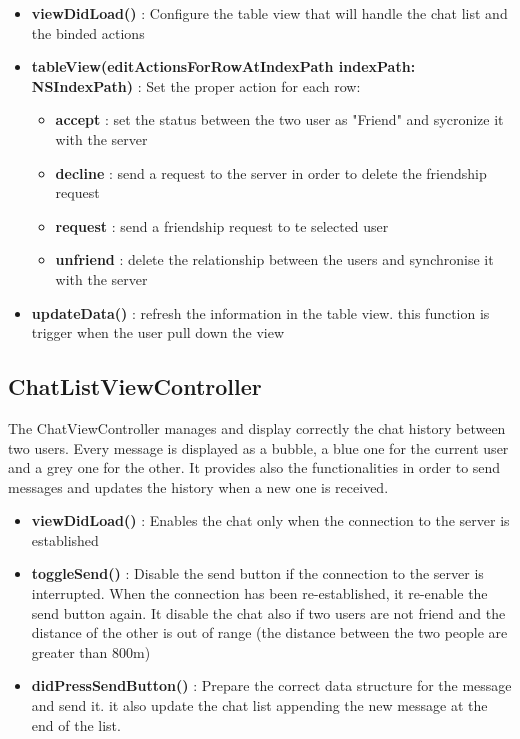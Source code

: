 \begin{itemize}

\item \textbf{viewDidLoad()} : Configure the table view that will handle the chat list and the binded actions

\item \textbf{tableView(editActionsForRowAtIndexPath indexPath: NSIndexPath)} : Set the proper action for each row:

\begin{itemize}
\item \textbf{accept} : set the status between the two user as "Friend" and sycronize it with the server
\item \textbf{decline} : send a request to the server in order to delete the friendship request
\item \textbf{request} : send a friendship request to te selected user
\item \textbf{unfriend} : delete the relationship between the users and synchronise it with the server

\end{itemize}

\item \textbf{updateData()} : refresh the information in the table view. this function is trigger when the user pull down the view

\end{itemize}

\subsection{ChatListViewController} 

The ChatViewController manages and display correctly the chat history between two users. Every message is displayed as a bubble, a blue one for the current user and a grey one for the other. It provides also the functionalities in order to send messages and updates the history when a new one is received.

\begin{itemize}

\item \textbf{viewDidLoad()} : Enables the chat only when the connection to the server is established
\item \textbf{toggleSend()} : Disable the send button if the connection to the server is interrupted. When the connection has been re-established, it re-enable the send button again. It disable the chat also if two users are not friend and the distance of the other is out of range (the distance between the two people are greater than 800m)
\item \textbf{didPressSendButton()} : Prepare the correct data structure for the message and send it. it also update the chat list appending the new message at the end of the list.
\end{itemize}

